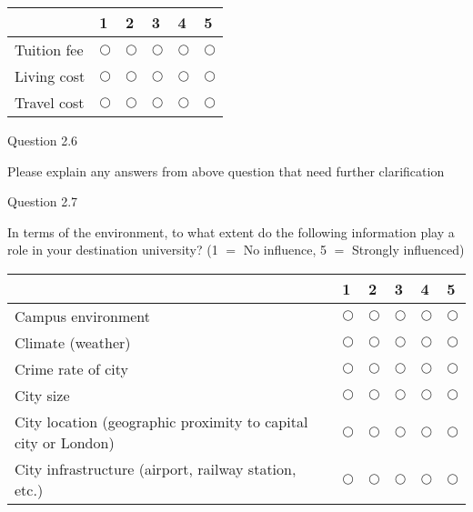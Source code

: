 \begin{table}[H]
\begin{center}
\begin{tabular}{|p{6cm}|p{1cm}|p{1cm}|p{1cm}|p{1cm}|p{1cm}|}
\hline
& 
1& 
2& 
3& 
4& 
5 \\
\hline
Tuition fee & 
$\bigcirc $& 
$\bigcirc $& 
$\bigcirc $& 
$\bigcirc $& 
$\bigcirc $ \\
\hline
Living cost & 
$\bigcirc $& 
$\bigcirc $& 
$\bigcirc $& 
$\bigcirc $& 
$\bigcirc $ \\
\hline
Travel cost & 
$\bigcirc $& 
$\bigcirc $& 
$\bigcirc $& 
$\bigcirc $& 
$\bigcirc $ \\
\hline
\end{tabular}
\label{tab1}
\end{center}
\end{table}



Question 2.6 

Please explain any answers from above question that need further 
clarification

Question 2.7 

In terms of the environment, to what extent do the following information 
play a role in your destination university? (1 $=$ No influence, 5 $=$ 
Strongly influenced) 


\begin{table}[H]
\begin{center}
\begin{tabular}{|p{6cm}|p{1cm}|p{1cm}|p{1cm}|p{1cm}|p{1cm}|}
\hline
& 
1& 
2& 
3& 
4& 
5 \\
\hline
Campus environment & 
$\bigcirc $& 
$\bigcirc $& 
$\bigcirc $& 
$\bigcirc $& 
$\bigcirc $ \\
\hline
Climate (weather) & 
$\bigcirc $& 
$\bigcirc $& 
$\bigcirc $& 
$\bigcirc $& 
$\bigcirc $ \\
\hline
Crime rate of city  & 
$\bigcirc $& 
$\bigcirc $& 
$\bigcirc $& 
$\bigcirc $& 
$\bigcirc $ \\
\hline
City size  & 
$\bigcirc $& 
$\bigcirc $& 
$\bigcirc $& 
$\bigcirc $& 
$\bigcirc $ \\
\hline
City location (geographic proximity to capital city or London)                  & 
$\bigcirc $& 
$\bigcirc $& 
$\bigcirc $& 
$\bigcirc $& 
$\bigcirc $ \\
\hline
City infrastructure (airport, railway station, etc.)                                                                             & 
$\bigcirc $& 
$\bigcirc $& 
$\bigcirc $& 
$\bigcirc $& 
$\bigcirc $ \\
\hline
\end{tabular}
\label{tab1}
\end{center}
\end{table}


